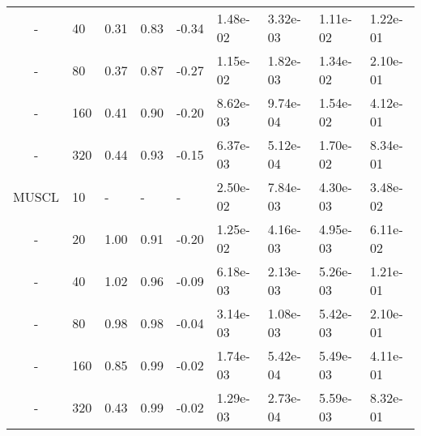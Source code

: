 \begin{table}[p]
{\begin{tabular}{cllllllll}
    - &   40 & 0.31 & 0.83 & -0.34 & 1.48e-02 & 3.32e-03 & 1.11e-02 & 1.22e-01 \\  
    - &   80 & 0.37 & 0.87 & -0.27 & 1.15e-02 & 1.82e-03 & 1.34e-02 & 2.10e-01 \\  
    - &  160 & 0.41 & 0.90 & -0.20 & 8.62e-03 & 9.74e-04 & 1.54e-02 & 4.12e-01 \\  
    - &  320 & 0.44 & 0.93 & -0.15 & 6.37e-03 & 5.12e-04 & 1.70e-02 & 8.34e-01 \\  
   \hline
    MUSCL &   10 & - & - & - & 2.50e-02 & 7.84e-03 & 4.30e-03 & 3.48e-02  \\ 
    - &   20 & 1.00 & 0.91 & -0.20 & 1.25e-02 & 4.16e-03 & 4.95e-03 & 6.11e-02 \\  
    - &   40 & 1.02 & 0.96 & -0.09 & 6.18e-03 & 2.13e-03 & 5.26e-03 & 1.21e-01 \\  
    - &   80 & 0.98 & 0.98 & -0.04 & 3.14e-03 & 1.08e-03 & 5.42e-03 & 2.10e-01 \\  
    - &  160 & 0.85 & 0.99 & -0.02 & 1.74e-03 & 5.42e-04 & 5.49e-03 & 4.11e-01 \\  
    - &  320 & 0.43 & 0.99 & -0.02 & 1.29e-03 & 2.73e-04 & 5.59e-03 & 8.32e-01 \\  
   \hline
   \end{tabular}
   }
\end{table}

\clearpage

